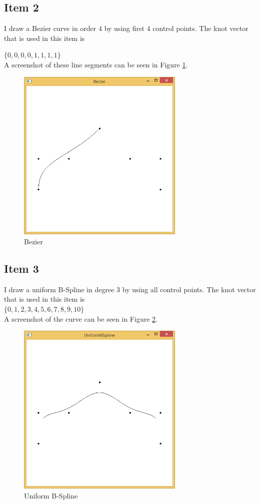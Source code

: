 \subsection{Item 2}

I draw a Bezier curve in order 4 by using first 4 control points. The knot vector that is used in this item is

$ \{ 0, 0, 0, 0, 1, 1, 1, 1\} $ \\

A screenshot of these line segments can be seen in Figure \ref{fig:11-3-2}.


\begin{figure}[hp]
\centering
\includegraphics[width=8cm]{../Screenshots/ex-11/3-2.png}
\caption{Bezier}
\label{fig:11-3-2}
\end{figure}

\subsection{Item 3}

I draw a uniform B-Spline in degree 3 by using all control points. The knot vector that is used in this item is\\

$ \{0, 1, 2, 3, 4, 5, 6, 7, 8, 9, 10\} $ \\

\noindent
A screenshot of the curve can be seen in Figure \ref{fig:11-3-3}.


\begin{figure}[hp]
\centering
\includegraphics[width=8cm]{../Screenshots/ex-11/3-3.png}
\caption{Uniform B-Spline}
\label{fig:11-3-3}
\end{figure}

